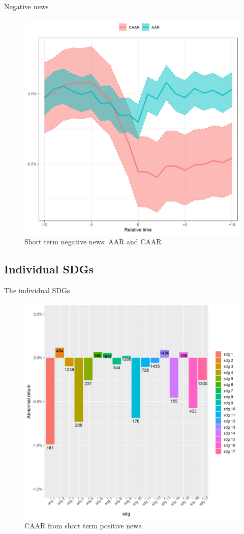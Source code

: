 Negative news
\begin{figure} [H]
    \centering
    \includegraphics[scale=0.6]{Projekt/1.Figures analysis/ST_negative_all_CI.png}
    \caption{Short term negative news: AAR and CAAR}
    \label{fig:ST_neg_news}
\end{figure}


\subsection{Individual SDGs}

The individual SDGs
\begin{figure} [H]
    \centering
    \includegraphics[scale=0.6]{Projekt/1.Figures analysis/ST_positive_sdg_bar.png}
    \caption{CAAR from short term positive news}
    \label{fig:ST_pos_news}
\end{figure}

